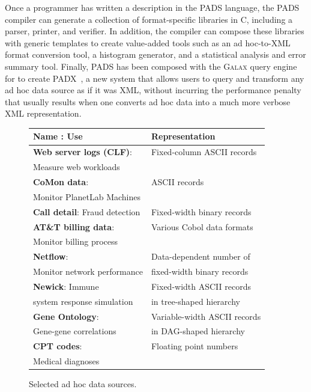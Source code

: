 \documentclass[nocopyrightspace]{sigplanconf}
\begin{document}
Once a programmer has written a description in the \textsc{PADS} language,
the \textsc{PADS} compiler can generate a collection of format-specific
libraries in C, including a parser, printer, and verifier.
In addition, the compiler can compose these libraries with
generic templates to create value-added tools such as an 
ad hoc-to-\textsc{XML} format conversion tool, a histogram generator, and
a statistical analysis and error summary tool.  Finally, \textsc{PADS}
has been composed with the \textsc{Galax} query engine~\cite{galax:edbt2004,galaxmanual,galax:icde2006} 
for  to create \textsc{PADX}~\cite{fernandez+:padx}, a new system
that allows users to query and transform any ad hoc data source as if it 
was \textsc{XML}, without incurring the performance penalty that usually
results when one converts ad hoc data into a much more verbose
\textsc{XML} representation.

\begin{figure}
\begin{center}
\begin{tabular}{|l|l|}
\hline
\textbf{Name} : Use   &  Representation               \\ \hline
\textbf{Web server logs (CLF)}:  &  Fixed-column ASCII records \\ 
Measure web workloads &                             \\ \hline
\textbf{CoMon data}: & ASCII records  \\ 
Monitor PlanetLab Machines &                              \\ \hline
\textbf{Call detail}: Fraud detection  &  Fixed-width binary records \\  \hline 
\textbf{AT\&T billing data}: & Various Cobol data formats  \\ 
Monitor billing process   &                             \\ \hline
\textbf{Netflow}:                        & Data-dependent number of     \\ 
Monitor network performance  & fixed-width binary records  \\ \hline
\textbf{Newick}:   Immune                 & Fixed-width ASCII records \\ 
system response simulation & in tree-shaped hierarchy\\ \hline                                
\textbf{Gene Ontology}:             & Variable-width ASCII records \\
Gene-gene correlations     & in DAG-shaped hierarchy \\ \hline
\textbf{CPT codes}:  & Floating point numbers \\ 
Medical diagnoses & \\ \hline
\end{tabular}

\caption{Selected ad hoc data sources.}
\label{figure:data-sources}
\end{center}
\end{figure}
\end{document}
